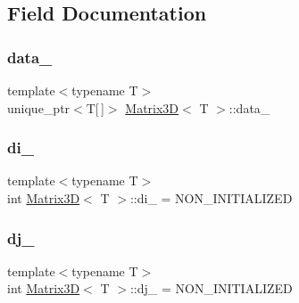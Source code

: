 \subsection{Field Documentation}
\mbox{\label{classMatrix3D_a94b477ac7008ab81acd18f2ee4d41d70_a94b477ac7008ab81acd18f2ee4d41d70}} 
\subsubsection{\texorpdfstring{data\+\_\+}{data\_}}
{\footnotesize\ttfamily template$<$typename T$>$ \\
unique\+\_\+ptr$<$T\mbox{[}$\,$\mbox{]}$>$ \mbox{\hyperlink{classMatrix3D}{Matrix3D}}$<$ T $>$\+::data\+\_\+\hspace{0.3cm}{\ttfamily [private]}}

\mbox{\label{classMatrix3D_af1e032d3ea19a5fc312866bd401e0f2b_af1e032d3ea19a5fc312866bd401e0f2b}} 
\subsubsection{\texorpdfstring{di\+\_\+}{di\_}}
{\footnotesize\ttfamily template$<$typename T$>$ \\
int \mbox{\hyperlink{classMatrix3D}{Matrix3D}}$<$ T $>$\+::di\+\_\+ = N\+O\+N\+\_\+\+I\+N\+I\+T\+I\+A\+L\+I\+Z\+ED\hspace{0.3cm}{\ttfamily [private]}}

\mbox{\label{classMatrix3D_a204c91363d19e8dc16bf911dfd72b912_a204c91363d19e8dc16bf911dfd72b912}} 
\subsubsection{\texorpdfstring{dj\+\_\+}{dj\_}}
{\footnotesize\ttfamily template$<$typename T$>$ \\
int \mbox{\hyperlink{classMatrix3D}{Matrix3D}}$<$ T $>$\+::dj\+\_\+ = N\+O\+N\+\_\+\+I\+N\+I\+T\+I\+A\+L\+I\+Z\+ED\hspace{0.3cm}{\ttfamily [private]}}

